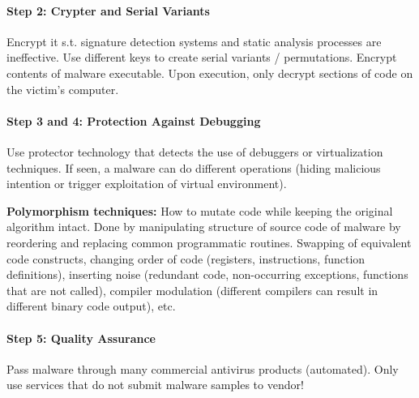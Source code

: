 \paragraph{Step 2: Crypter and Serial Variants}
Encrypt it s.t. signature detection systems and static analysis processes are ineffective. Use different keys to create serial variants / permutations. Encrypt contents of malware executable. Upon execution, only decrypt sections of code on the victim's computer.

\paragraph{Step 3 and 4: Protection Against Debugging}
Use protector technology that detects the use of debuggers or virtualization techniques. If seen, a malware can do different operations (hiding malicious intention or trigger exploitation of virtual environment). %

\textbf{Polymorphism techniques:} How to mutate code while keeping the original algorithm intact. Done by manipulating structure of source code of malware by reordering and replacing common programmatic routines. Swapping of equivalent code constructs, changing order of code (registers, instructions, function definitions), inserting noise (redundant code, non-occurring exceptions, functions that are not called), compiler modulation (different compilers can result in different binary code output), etc.

\paragraph{Step 5: Quality Assurance}
Pass malware through many commercial antivirus products (automated). Only use services that do not submit malware samples to vendor! %



